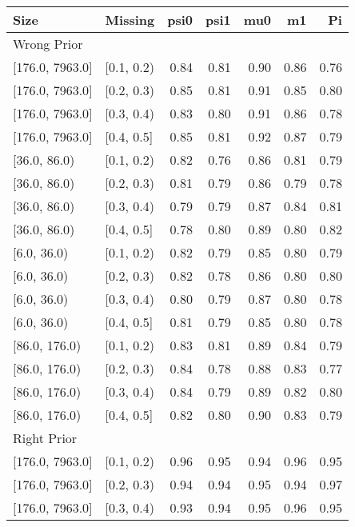 \begin{table}[ht]
\centering
\begin{tabular}{llrrrrr}
  \toprule
Size & Missing & psi0 & psi1 & mu0 & m1 & Pi \\ 
  \midrule
\multicolumn{7}{l}{Wrong Prior}\\
{[176.0, 7963.0]} & {[0.1, 0.2)} & 0.84 & 0.81 & 0.90 & 0.86 & 0.76 \\ 
  {[176.0, 7963.0]} & {[0.2, 0.3)} & 0.85 & 0.81 & 0.91 & 0.85 & 0.80 \\ 
  {[176.0, 7963.0]} & {[0.3, 0.4)} & 0.83 & 0.80 & 0.91 & 0.86 & 0.78 \\ 
  {[176.0, 7963.0]} & {[0.4, 0.5]} & 0.85 & 0.81 & 0.92 & 0.87 & 0.79 \\ 
  {[36.0, 86.0)} & {[0.1, 0.2)} & 0.82 & 0.76 & 0.86 & 0.81 & 0.79 \\ 
  {[36.0, 86.0)} & {[0.2, 0.3)} & 0.81 & 0.79 & 0.86 & 0.79 & 0.78 \\ 
  {[36.0, 86.0)} & {[0.3, 0.4)} & 0.79 & 0.79 & 0.87 & 0.84 & 0.81 \\ 
  {[36.0, 86.0)} & {[0.4, 0.5]} & 0.78 & 0.80 & 0.89 & 0.80 & 0.82 \\ 
  {[6.0, 36.0)} & {[0.1, 0.2)} & 0.82 & 0.79 & 0.85 & 0.80 & 0.79 \\ 
  {[6.0, 36.0)} & {[0.2, 0.3)} & 0.82 & 0.78 & 0.86 & 0.80 & 0.80 \\ 
  {[6.0, 36.0)} & {[0.3, 0.4)} & 0.80 & 0.79 & 0.87 & 0.80 & 0.78 \\ 
  {[6.0, 36.0)} & {[0.4, 0.5]} & 0.81 & 0.79 & 0.85 & 0.80 & 0.78 \\ 
  {[86.0, 176.0)} & {[0.1, 0.2)} & 0.83 & 0.81 & 0.89 & 0.84 & 0.79 \\ 
  {[86.0, 176.0)} & {[0.2, 0.3)} & 0.84 & 0.78 & 0.88 & 0.83 & 0.77 \\ 
  {[86.0, 176.0)} & {[0.3, 0.4)} & 0.84 & 0.79 & 0.89 & 0.82 & 0.80 \\ 
  {[86.0, 176.0)} & {[0.4, 0.5]} & 0.82 & 0.80 & 0.90 & 0.83 & 0.79 \\ 
   \midrule
\multicolumn{7}{l}{Right Prior}\\
{[176.0, 7963.0]} & {[0.1, 0.2)} & 0.96 & 0.95 & 0.94 & 0.96 & 0.95 \\ 
  {[176.0, 7963.0]} & {[0.2, 0.3)} & 0.94 & 0.94 & 0.95 & 0.94 & 0.97 \\ 
  {[176.0, 7963.0]} & {[0.3, 0.4)} & 0.93 & 0.94 & 0.95 & 0.96 & 0.95 \\ 

\end{tabular}
\end{table}
